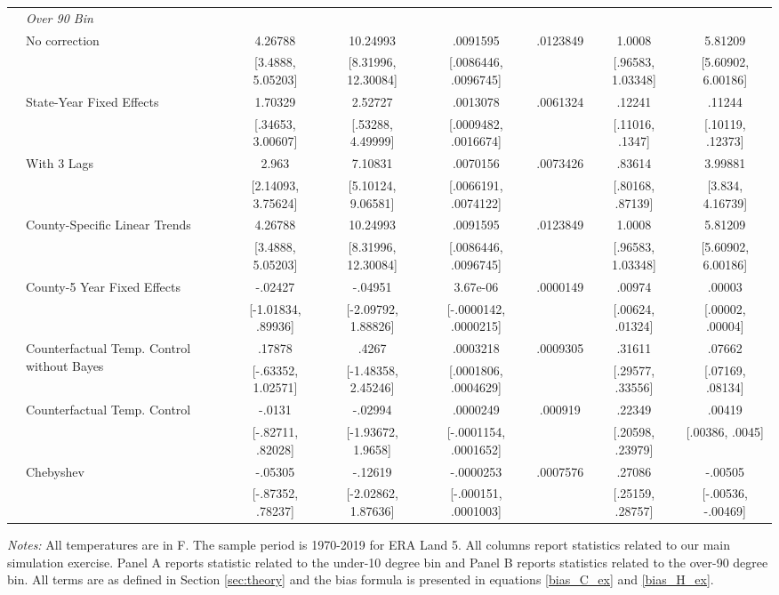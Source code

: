 \begin{landscape}
\begin{table}[htb]
{\begin{threeparttable}
\begin{tabular}{llcccccc}
\cmidrule(lr){2-8}  & \textit{Over 90 Bin} \\
  & \multirow{2}{*}{No correction} & 4.26788 & 10.24993 &  .0091595 & .0123849 & 1.0008 & 5.81209 \\  & & [3.4888, 5.05203] & [8.31996, 12.30084] & [.0086446, .0096745] & & [.96583, 1.03348] & [5.60902, 6.00186] \\  & \multirow{2}{*}{State-Year Fixed Effects} & 1.70329 & 2.52727 &  .0013078 & .0061324 & .12241 & .11244 \\  & & [.34653, 3.00607] & [.53288, 4.49999] & [.0009482, .0016674] & & [.11016, .1347] & [.10119, .12373] \\  & \multirow{2}{*}{With 3 Lags} & 2.963 & 7.10831 &  .0070156 & .0073426 & .83614 & 3.99881 \\  & & [2.14093, 3.75624] & [5.10124, 9.06581] & [.0066191, .0074122] & & [.80168, .87139] & [3.834, 4.16739] \\  & \multirow{2}{*}{County-Specific Linear Trends} & 4.26788 & 10.24993 &  .0091595 & .0123849 & 1.0008 & 5.81209 \\  & & [3.4888, 5.05203] & [8.31996, 12.30084] & [.0086446, .0096745] & & [.96583, 1.03348] & [5.60902, 6.00186] \\  & \multirow{2}{*}{County-5 Year Fixed Effects} & -.02427 & -.04951 &  3.67e-06 & .0000149 & .00974 & .00003 \\  & & [-1.01834, .89936] & [-2.09792, 1.88826] & [-.0000142, .0000215] & & [.00624, .01324] & [.00002, .00004] \\  & \multirow{2}{*}{Counterfactual Temp. Control without Bayes } & .17878 & .4267 &  .0003218 & .0009305 & .31611 & .07662 \\  & & [-.63352, 1.02571] & [-1.48358, 2.45246] & [.0001806, .0004629] & & [.29577, .33556] & [.07169, .08134] \\  & \multirow{2}{*}{Counterfactual Temp. Control} & -.0131 & -.02994 &  .0000249 & .000919 & .22349 & .00419 \\  & & [-.82711, .82028] & [-1.93672, 1.9658] & [-.0001154, .0001652] & & [.20598, .23979] & [.00386, .0045] \\  & \multirow{2}{*}{Chebyshev} & -.05305 & -.12619 & -.0000253 & .0007576 & .27086 & -.00505 \\  & & [-.87352, .78237] & [-2.02862, 1.87636] & [-.000151, .0001003] & & [.25159, .28757] & [-.00536, -.00469] \\
\hline \hline
\end{tabular}
\begin{tablenotes}
\textit{Notes:} All temperatures are in \degree F. The sample period is 1970-2019 for ERA Land 5. All columns report statistics related to our main simulation exercise. Panel A reports statistic related to the under-10 degree bin and Panel B reports statistics related to the over-90 degree bin. All terms are as defined in Section \ref{sec:theory} and the bias formula is presented in equations \eqref{bias_C_ex} and \eqref{bias_H_ex}.
\end{tablenotes}
\end{threeparttable}
}
\end{table}
\end{landscape}
\restoregeometry
